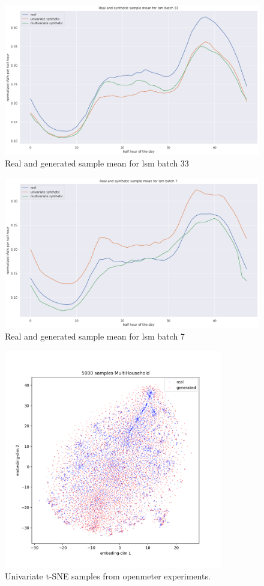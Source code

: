 \begin{figure}
    \centering
    \includegraphics[width=\textwidth]{images/lsm_dm_33.png}
    \caption{Real and generated sample mean for lsm batch 33}
    \label{fig:sample mean 37}
\end{figure}
\begin{figure}
    \centering
    \includegraphics[width=\textwidth]{images/lsm_dm_7.png}
    \caption{Real and generated sample mean for lsm batch 7}
    \label{fig:sample mean 53}
\end{figure}
\begin{figure}
    \centering
    \includegraphics[width=0.85\textwidth]{images/om_uni_tsne.png}
    \caption{Univariate t-SNE samples from openmeter experiments.}
    \label{fig:om tsne uni}
\end{figure}
